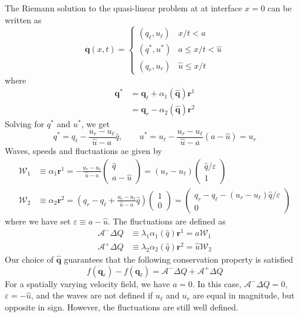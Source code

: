 \documentclass{article}
\begin{document}
The Riemann solution to the quasi-linear problem at at interface $x=0$ can be written as 
\begin{equation}
\mathbf q(x,t) = \left\{\begin{array}{ll}
(q_\ell, u_\ell) &   x/t < a \\ 
(q^*, u^*)       &   a   \le x/t < \widehat{u} \\ 
(q_r, u_r)       &   \widehat{u} \le x/t
\end{array}
\right.
\end{equation}
where
\begin{align}
\mathbf q^* 
& = \mathbf q_\ell + \alpha_1(\widehat{\mathbf q}) {\mathbf r}^1 \\
& = \mathbf q_r - \alpha_2(\widehat{\mathbf q}) {\mathbf r}^2
\end{align}
Solving for $q^*$ and $u^*$, we get
\begin{equation}
q^*  = q_\ell - \frac{u_r - u_\ell}{\widehat{u}-a} \widehat{q}, \qquad
u^*  = u_\ell - \frac{u_r - u_\ell}{\widehat{u}-a} (a - \widehat{u}) = u_r
\end{equation}
Waves, speeds and fluctuations ae given by
\begin{align}
\mathcal W_1 & \equiv \alpha_1 \mathbf r^1 = - \frac{u_r - u_\ell}{\widehat{u}-a} 
\left(\begin{array}{c} \widehat{q} \\ a - \widehat{u}\end{array}\right) 
= (u_r - u_\ell)
\left(\begin{array}{c} \widehat{q}/\varepsilon \\ 
1 \end{array}\right) \\
\mathcal W_2 & \equiv \alpha_2 \mathbf r^2 = 
\left(q_r - q_\ell + \frac{u_r - u_\ell}{\widehat{u}-a}\widehat{q} \right)
\left(\begin{array}{c} 1 \\ 0\end{array}\right) 
= \left(\begin{array}{c} q_r - q_\ell - (u_r - u_\ell) \widehat{q}/\varepsilon \\ 
0 \end{array}\right) 
\end{align}
where we have set $\varepsilon \equiv a - \widehat{u}$. 
The fluctuations are  defined as
\begin{align}
\mathcal A^- \Delta Q & \equiv \lambda_1 \alpha_1(\widehat{q}) \mathbf r^1 
= a \mathcal W_1 \\
\mathcal A^+ \Delta Q & \equiv \lambda_2 \alpha_2(\widehat{q}) \mathbf r^2 
= \widehat{u} \mathcal W_2
\end{align}
Our choice of $\widehat{\mathbf q}$ guarantees that the following conservation property is satisfied
\begin{equation}
f(\mathbf q_r) - f(\mathbf q_\ell) = \mathcal A^- \Delta Q + \mathcal A^+ \Delta Q
\end{equation}
For a spatially varying velocity field, we have $a = 0$.  In this case, $\mathcal A^- \Delta Q = 0$, $\varepsilon = -\widehat{u}$, and the waves are not defined if $u_\ell$ and $u_r$ are equal in magnitude, but opposite in sign. However, the fluctuations are still well defined.  
\end{document}
